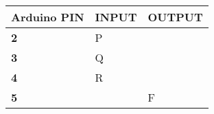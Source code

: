 \begin{tabularx}{0.46\textwidth} { 
  | >{\centering\arraybackslash}X 
  | >{\centering\arraybackslash}X 
  | >{\centering\arraybackslash}X  | }
\hline
\textbf{Arduino PIN} & \textbf{INPUT} & \textbf{OUTPUT} \\ 
\hline
\textbf 2 & P & \\
\hline
\textbf 3 & Q & \\
\hline
\textbf 4 & R & \\
\hline
\textbf 5 & & F \\
\hline
\end{tabularx}
